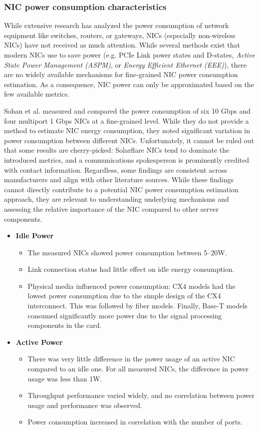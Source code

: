 \subsubsection{NIC power consumption characteristics}
While extensive research has analyzed the power consumption of network equipment like switches, routers, or gateways, NICs (especially non-wireless NICs) have not received as much attention. While several methods exist that modern NICs use to save power (e.g. PCIe Link power states and D-states, \textit{Active State Power Management (ASPM)}, or \textit{Energy Efficient Ethernet (EEE)}), there are no widely available mechanisms for fine-grained NIC power consumption estimation. As a consequence, NIC power can only be approximated based on the few available metrics.

Sohan et al.\parencite{sohanCharacterizing10Gbps2010} measured and compared the power consumption of six 10 Gbps and four multiport 1 Gbps NICs at a fine-grained level. While they do not provide a method to estimate NIC energy consumption, they noted significant variation in power consumption between different NICs. Unfortunately, it cannot be ruled out that some results are cherry-picked: Solarflare NICs tend to dominate the introduced metrics, and a communications spokesperson is prominently credited with contact information. Regardless, some findings are consistent across manufacturers and align with other literature sources\parencite{gough2015energy}. While these findings cannot directly contribute to a potential NIC power consumption estimation approach, they are relevant to understanding underlying mechanisms and assessing the relative importance of the NIC compared to other server components.

\begin{itemize}
    \item \textbf{Idle Power}
    \begin{itemize}
        \item The measured NICs showed power consumption between 5--20W.
        \item Link connection status had little effect on idle energy consumption.
        \item Physical media influenced power consumption: CX4 models had the lowest power consumption due to the simple design of the CX4 interconnect. This was followed by fiber models. Finally, Base-T models consumed significantly more power due to the signal processing components in the card.
    \end{itemize}
    \item \textbf{Active Power}
    \begin{itemize}
        \item There was very little difference in the power usage of an active NIC compared to an idle one. For all measured NICs, the difference in power usage was less than 1W.
        \item Throughput performance varied widely, and no correlation between power usage and performance was observed.
        \item Power consumption increased in correlation with the number of ports.
    \end{itemize}
\end{itemize}

